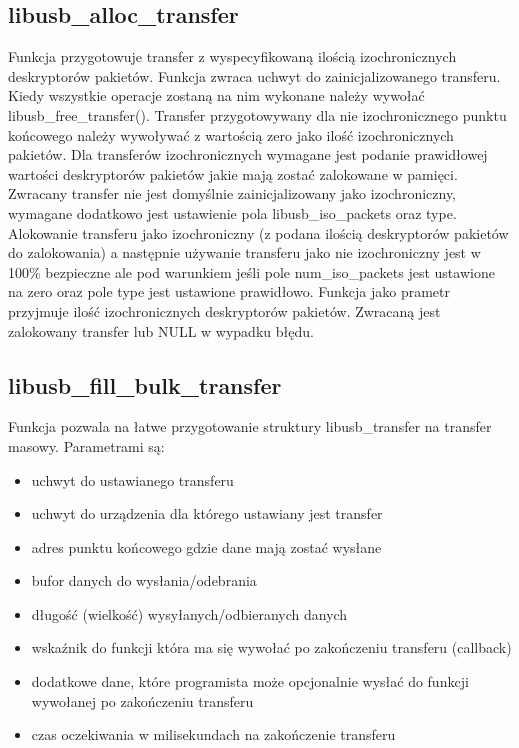 \documentclass{BscUS}
\begin{document}
\subsection{libusb\_alloc\_transfer}
Funkcja przygotowuje transfer z wyspecyfikowaną ilością 	izochronicznych deskryptorów pakietów.
\newline
Funkcja zwraca uchwyt do zainicjalizowanego transferu. Kiedy wszystkie operacje zostaną na nim wykonane należy wywołać libusb\_free\_transfer().
\newline
Transfer przygotowywany dla nie izochronicznego punktu końcowego należy wywoływać z wartością zero jako ilość izochronicznych pakietów.
\newline
Dla transferów izochronicznych wymagane jest podanie prawidłowej wartości deskryptorów pakietów jakie mają zostać zalokowane w pamięci. Zwracany transfer nie jest domyślnie zainicjalizowany jako izochroniczny, wymagane dodatkowo jest ustawienie pola libusb\_iso\_packets oraz type.
\newline
Alokowanie transferu jako izochroniczny (z podana ilością deskryptorów pakietów do zalokowania) a następnie używanie transferu jako nie izochroniczny jest w 100\% bezpieczne ale pod warunkiem jeśli pole num\_iso\_packets jest ustawione na zero oraz pole type jest ustawione prawidłowo.
\newline
Funkcja jako prametr przyjmuje ilość izochronicznych deskryptorów pakietów.
\newline
Zwracaną jest zalokowany transfer lub NULL w wypadku błędu.
\subsection{libusb\_fill\_bulk\_transfer}
Funkcja pozwala na łatwe przygotowanie struktury libusb\_transfer na transfer masowy.
\newline
Parametrami są:
\begin{itemize}
\item uchwyt do ustawianego transferu
\item uchwyt do urządzenia dla którego ustawiany jest transfer
\item adres punktu końcowego gdzie dane mają zostać wysłane
\item bufor danych do wysłania/odebrania
\item długość (wielkość) wysyłanych/odbieranych danych
\item wskaźnik do funkcji która ma się wywołać po zakończeniu transferu (callback)
\item dodatkowe dane, które programista może opcjonalnie wysłać do funkcji wywołanej po zakończeniu transferu 
\item czas oczekiwania w milisekundach na zakończenie transferu
\end{itemize}
\end{document}
